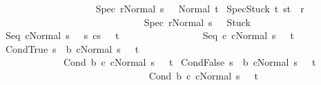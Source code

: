 \begin{isabellebody}
\ \ \ \ \ \ \ \ \ {\isasymLongrightarrow}\ \isanewline
\ \ \ \ \ \ \ \ \ {\isasymGamma}{\isasymturnstile}{\isasymlangle}Spec\ r{\isacharcomma}Normal\ s{\isasymrangle}\ {\isasymRightarrow}\ \ Normal\ t{\isachardoublequoteclose}\isanewline
\isanewline
{\isacharbar}\ SpecStuck{\isacharcolon}\ {\isachardoublequoteopen}{\isasymforall}t{\isachardot}\ {\isacharparenleft}s{\isacharcomma}t{\isacharparenright}\ {\isasymnotin}\ r\ \isanewline
\ \ \ \ \ \ \ \ \ \ \ \ \ \ {\isasymLongrightarrow}\ \isanewline
\ \ \ \ \ \ \ \ \ \ \ \ \ \ {\isasymGamma}{\isasymturnstile}{\isasymlangle}Spec\ r{\isacharcomma}Normal\ s{\isasymrangle}\ {\isasymRightarrow}\ \ Stuck{\isachardoublequoteclose}\isanewline
\isanewline
{\isacharbar}\ Seq{\isacharcolon}\ {\isachardoublequoteopen}{\isasymlbrakk}{\isasymGamma}{\isasymturnstile}{\isasymlangle}cNormal\ s{\isasymrangle}\ {\isasymRightarrow}\ \ s{\isacharprime}{\isacharsemicolon}\ {\isasymGamma}{\isasymturnstile}{\isasymlangle}cs{\isacharprime}{\isasymrangle}\ {\isasymRightarrow}\ \ t{\isasymrbrakk}\isanewline
\ \ \ \ \ \ \ \ {\isasymLongrightarrow}\isanewline
\ \ \ \ \ \ \ \ {\isasymGamma}{\isasymturnstile}{\isasymlangle}Seq\ c\ cNormal\ s{\isasymrangle}\ {\isasymRightarrow}\ \ t{\isachardoublequoteclose}\ \isanewline
\isanewline
{\isacharbar}\ CondTrue{\isacharcolon}\ {\isachardoublequoteopen}{\isasymlbrakk}s\ {\isasymin}\ b{\isacharsemicolon}\ {\isasymGamma}{\isasymturnstile}{\isasymlangle}cNormal\ s{\isasymrangle}\ {\isasymRightarrow}\ \ t{\isasymrbrakk}\ \isanewline
\ \ \ \ \ \ \ \ \ \ \ \ \ {\isasymLongrightarrow}\ \ \isanewline
\ \ \ \ \ \ \ \ \ \ \ \ \ {\isasymGamma}{\isasymturnstile}{\isasymlangle}Cond\ b\ c\ cNormal\ s{\isasymrangle}\ {\isasymRightarrow}\ \ t{\isachardoublequoteclose}\isanewline
\isanewline
{\isacharbar}\ CondFalse{\isacharcolon}\ {\isachardoublequoteopen}{\isasymlbrakk}s\ {\isasymnotin}\ b{\isacharsemicolon}\ {\isasymGamma}{\isasymturnstile}{\isasymlangle}cNormal\ s{\isasymrangle}\ {\isasymRightarrow}\ \ t{\isasymrbrakk}\ \isanewline
\ \ \ \ \ \ \ \ \ \ \ \ \ \ {\isasymLongrightarrow}\ \ \isanewline
\ \ \ \ \ \ \ \ \ \ \ \ \ \ {\isasymGamma}{\isasymturnstile}{\isasymlangle}Cond\ b\ c\ cNormal\ s{\isasymrangle}\ {\isasymRightarrow}\ \ t{\isachardoublequoteclose}\isanewline

\end{isabellebody}
